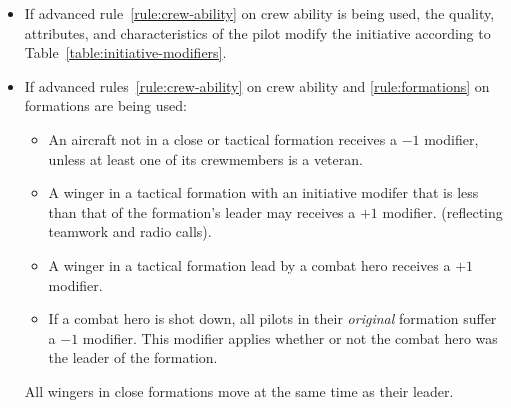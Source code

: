 {\begin{itemize}
    \item{} If advanced rule~\ref{rule:crew-ability} on crew ability is being used, the quality, attributes, and characteristics of the pilot modify the initiative according to Table~\ref{table:initiative-modifiers}.

	\item{} If advanced rules~\ref{rule:crew-ability} on crew ability and \ref{rule:formations} on formations are being used:
    \begin{itemize}
        \item An aircraft not in a close or tactical formation receives a $-1$ modifier, unless at least one of its crewmembers is a veteran.
        \item A winger in a tactical formation with an initiative modifer that is less than that of the formation’s leader may  receives a $+1$ modifier. (reflecting teamwork and radio calls).
        \item A winger in a tactical formation lead by a combat hero receives a $+1$ modifier.
        \item If a combat hero is shot down, all pilots in their \emph{original} formation suffer a $-1$ modifier. This modifier applies whether or not the combat hero was the leader of the formation.
    \end{itemize}
    All wingers in close formations move at the same time as their leader.
\end{itemize}

}


